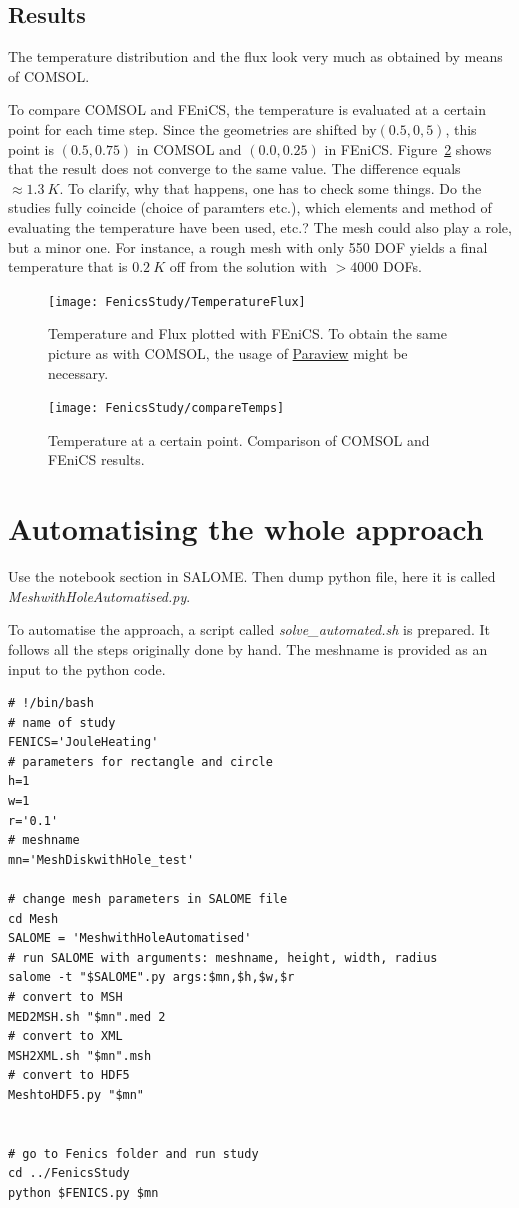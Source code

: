 \documentclass{article}
\begin{document}
\subsection{Results}
The temperature distribution and the flux look very much as obtained by means of COMSOL.

To compare COMSOL and FEniCS, the temperature is evaluated at a certain point for each time step.
Since the geometries are shifted by$(0.5, 0,5)$, this point is $(0.5, 0.75)$ in COMSOL and $(0.0, 0.25)$ in FEniCS.
Figure~\ref{Fig:TempTimeComsFen} shows that the result does not converge to the same value.
The difference equals $\approx \SI{1.3}{K}$. 
To clarify, why that happens, one has to check some things. Do the studies fully coincide (choice of paramters etc.), which elements and method of evaluating the temperature have been used, etc.?
The mesh could also play a role, but a minor one. 
For instance, a rough mesh with only 550 DOF yields a final temperature that is $\SI{0.2}{K}$ off from the solution with $>4000$ DOFs. 
\begin{figure}[H]
\label{Fig:TempFlux}
\centering
\texttt{[image: FenicsStudy/TemperatureFlux]}
\caption{Temperature and Flux plotted with FEniCS. To obtain the same picture as with COMSOL, the usage of \href{https://www.paraview.org/}{Paraview} might be necessary.}
\end{figure}
\begin{figure}[H]
\label{Fig:TempTimeComsFen}
\centering
\texttt{[image: FenicsStudy/compareTemps]}
\caption{Temperature at a certain point. Comparison of COMSOL and FEniCS results.}
\end{figure}
\section{Automatising the whole approach}
Use the notebook section in SALOME. 
Then dump python file, here it is called \textit{MeshwithHoleAutomatised.py}.

To automatise the approach, a script called \textit{solve\_automated.sh} is prepared.
It follows all the steps originally done by hand.
The meshname is provided as an input to the python code.
\begin{lstlisting}
# !/bin/bash
# name of study
FENICS='JouleHeating'
# parameters for rectangle and circle
h=1
w=1
r='0.1'
# meshname
mn='MeshDiskwithHole_test'

# change mesh parameters in SALOME file
cd Mesh
SALOME = 'MeshwithHoleAutomatised'
# run SALOME with arguments: meshname, height, width, radius
salome -t "$SALOME".py args:$mn,$h,$w,$r
# convert to MSH
MED2MSH.sh "$mn".med 2
# convert to XML
MSH2XML.sh "$mn".msh
# convert to HDF5
MeshtoHDF5.py "$mn" 


# go to Fenics folder and run study
cd ../FenicsStudy
python $FENICS.py $mn
\end{lstlisting}
\end{document}
